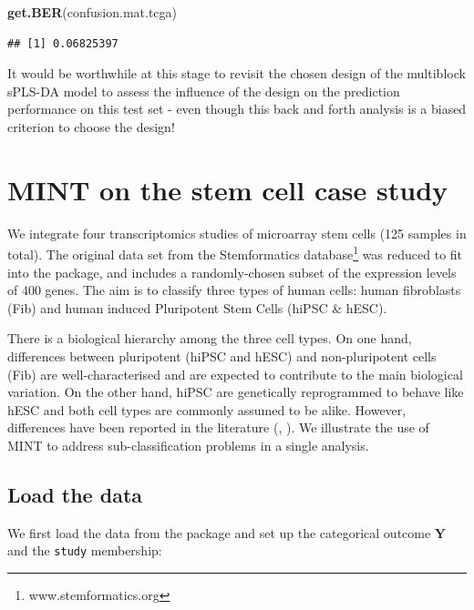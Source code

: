\documentclass[]{book}
\newenvironment{Shaded}{\begin{snugshade}}{\end{snugshade}}
\newcommand{\KeywordTok}[1]{\textcolor[rgb]{0.13,0.29,0.53}{\textbf{#1}}}
\newcommand{\StringTok}[1]{\textcolor[rgb]{0.31,0.60,0.02}{#1}}
\newcommand{\CommentTok}[1]{\textcolor[rgb]{0.56,0.35,0.01}{\textit{#1}}}
\newcommand{\OperatorTok}[1]{\textcolor[rgb]{0.81,0.36,0.00}{\textbf{#1}}}
\newcommand{\NormalTok}[1]{#1}
\begin{document}
\begin{Shaded}
\begin{Highlighting}[]
\KeywordTok{get.BER}\NormalTok{(confusion.mat.tcga)}
\end{Highlighting}
\end{Shaded}

\begin{verbatim}
## [1] 0.06825397
\end{verbatim}

It would be worthwhile at this stage to revisit the chosen design of the
multiblock sPLS-DA model to assess the influence of the design on the
prediction performance on this test set - even though this back and
forth analysis is a biased criterion to choose the design!

\chapter{MINT on the stem cell case study}\label{mint-stemcell-case}

We integrate four transcriptomics studies of microarray stem cells (125
samples in total). The original data set from the Stemformatics
database\footnote{www.stemformatics.org} \citep{Well13} was reduced to
fit into the package, and includes a randomly-chosen subset of the
expression levels of 400 genes. The aim is to classify three types of
human cells: human fibroblasts (Fib) and human induced Pluripotent Stem
Cells (hiPSC \& hESC).

There is a biological hierarchy among the three cell types. On one hand,
differences between pluripotent (hiPSC and hESC) and non-pluripotent
cells (Fib) are well-characterised and are expected to contribute to the
main biological variation. On the other hand, hiPSC are genetically
reprogrammed to behave like hESC and both cell types are commonly
assumed to be alike. However, differences have been reported in the
literature (\citet{Chi09}, \citet{New10}). We illustrate the use of MINT
to address sub-classification problems in a single analysis.

\section{Load the data}\label{mint:load}

We first load the data from the package and set up the categorical
outcome \(\boldsymbol Y\) and the \texttt{study} membership:

\begin{Shaded}
\end{Shaded}
\end{document}

